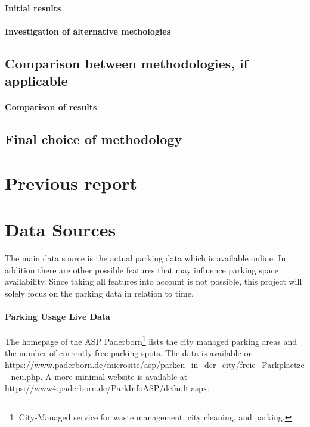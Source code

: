\documentclass[journal,10pt]{IEEEtran}
\begin{document}
\paragraph{Initial results}
\paragraph{Investigation of alternative methologies}

\subsection{Comparison between methodologies, if applicable}
\paragraph{Comparison of results}

\subsection{Final choice of methodology}

\section{Previous report}


%
%

\section{Data Sources}\label{data sources}
The main data source is the actual parking data which is available online. In addition there are other possible features that may influence parking space availability. Since taking all features into account is not possible, this project will solely focus on the parking data in relation to time. 

\paragraph{Parking Usage Live Data}
The homepage of the ASP Paderborn\footnote{City-Managed service for waste management, city cleaning, and parking.} lists the city managed parking areas and the number of currently free parking spots. 
The data is available on \url{https://www.paderborn.de/microsite/asp/parken_in_der_city/freie_Parkplaetze_neu.php}. A more minimal website is available at \url{https://www4.paderborn.de/ParkInfoASP/default.aspx}. 
\end{document}
